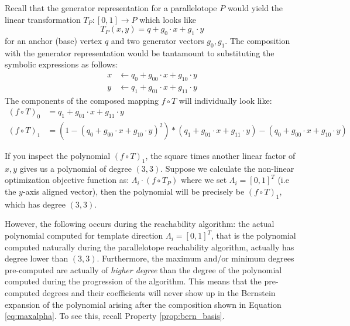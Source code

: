 Recall that the generator representation for a parallelotope $P$ would yield the linear transformation $T_P:[0,1] \rightarrow P$ which looks like $$ T_P(x,y) = q + g_0\cdot x + g_1\cdot y$$ for an anchor (base) vertex $q$ and two generator vectors $g_0,g_1$.
%
The composition with the generator representation would be tantamount to substituting the symbolic expressions as follows:
%
\begin{align} x & \leftarrow q_0 + g_{00}\cdot x + g_{10}\cdot y \\  y & \leftarrow q_1 + g_{01}\cdot x + g_{11}\cdot y\end{align}
%
The components of the composed mapping $f \circ T$ will individually look like:
%
\begin{align} (f \circ T)_0 & = q_1 + g_{01}\cdot x + g_{11}\cdot y \\ (f \circ T)_1 & = (1 - (q_0 + g_{00}\cdot x + g_{10}\cdot y)^2) * (q_1 + g_{01}\cdot x + g_{11}\cdot y) - (q_0 + g_{00}\cdot x + g_{10}\cdot y) \end{align}

If you inspect the polynomial $(f \circ T)_1$, the square times another linear factor of $x,y$ gives us a polynomial of degree $(3,3)$.
%
Suppose we calculate the non-linear optimization objective function as: $\Lambda_i \cdot (f \circ T_P)$ where we set $\Lambda_i = [0,1]^T$ (i.e the $y$-axis aligned vector), then the polynomial will be precisely be $(f \circ T)_1$, which has degree $(3,3)$.

However, the following occurs during the reachability algorithm: the actual polynomial computed for template direction $\Lambda_i =[0,1]^T$, that is the polynomial computed naturally during the parallelotope reachability algorithm, actually has degree lower than $(3,3)$.
%
Furthermore, the maximum and/or minimum degrees pre-computed are actually of \emph{higher degree} than the degree of the polynomial computed during the progression of the algorithm. This means that the pre-computed degrees and their coefficients will never show up in the Bernstein expansion of the polynomial arising after the composition shown in Equation \ref{eq:maxalpha}. To see this, recall Property \ref{prop:bern_basis}.

